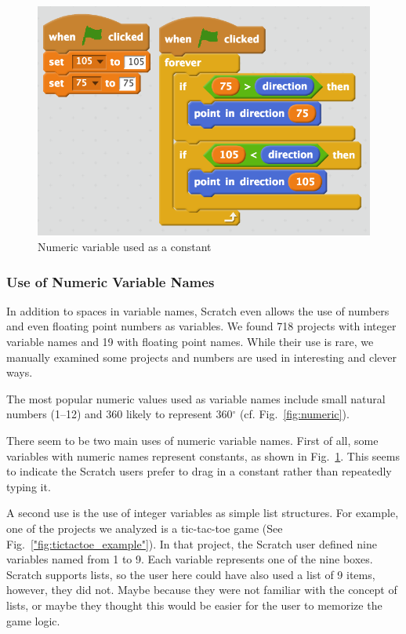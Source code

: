 \documentclass[conference]{IEEEtran}
\begin{document}
\begin{figure}[!b]
	\begin{center}
		\includegraphics[width=\columnwidth]{fig/constants}
		\caption{Numeric variable used as a constant}
		\label{fig:constants}
	\end{center}
\end{figure} 	

\subsubsection{Use of Numeric Variable Names}
In addition to spaces in variable names, Scratch even allows the use of numbers and even floating point numbers as variables. We found 718 projects with integer variable names and 19 with floating point names. While their use is rare, we manually examined some projects and numbers are used in interesting and clever ways. 

The most popular numeric values used as variable names include small natural numbers (1--12) and 360 likely to represent 360$^\circ$ (cf. Fig.~\ref{fig:numeric}).

There seem to be two main uses of numeric variable names. First of all, some variables with numeric names represent constants, as shown in Fig.~\ref{fig:constants}. This seems to indicate the Scratch users prefer to drag in a constant rather than repeatedly typing it.

A second use is the use of integer variables as simple list structures. For example, one of the projects we analyzed is a tic-tac-toe game (See Fig.~\ref{"fig:tictactoe_example"}). In that project, the Scratch user defined nine variables named from 1 to 9. Each variable represents one of the nine boxes. Scratch supports lists, so the user here could have also used a list of 9 items, however, they did not. Maybe because they were not familiar with the concept of lists, or maybe they thought this would be easier for the user to memorize the game logic.  
\end{document}
